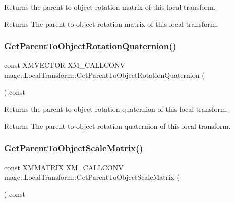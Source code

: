 Returns the parent-\/to-\/object rotation matrix of this local transform.

\begin{DoxyReturn}{Returns}
The parent-\/to-\/object rotation matrix of this local transform. 
\end{DoxyReturn}
\hypertarget{classmage_1_1_local_transform_a66e6d3320e87461203f91599e23ee6c1}{}\label{classmage_1_1_local_transform_a66e6d3320e87461203f91599e23ee6c1} 
\subsubsection{\texorpdfstring{Get\+Parent\+To\+Object\+Rotation\+Quaternion()}{GetParentToObjectRotationQuaternion()}}
{\footnotesize\ttfamily const X\+M\+V\+E\+C\+T\+OR X\+M\+\_\+\+C\+A\+L\+L\+C\+O\+NV mage\+::\+Local\+Transform\+::\+Get\+Parent\+To\+Object\+Rotation\+Quaternion (\begin{DoxyParamCaption}{ }\end{DoxyParamCaption}) const\hspace{0.3cm}{\ttfamily [noexcept]}}

Returns the parent-\/to-\/object rotation quaternion of this local transform.

\begin{DoxyReturn}{Returns}
The parent-\/to-\/object rotation quaternion of this local transform. 
\end{DoxyReturn}
\hypertarget{classmage_1_1_local_transform_a81ef828c64270716e5095f2cf571fad7}{}\label{classmage_1_1_local_transform_a81ef828c64270716e5095f2cf571fad7} 
\subsubsection{\texorpdfstring{Get\+Parent\+To\+Object\+Scale\+Matrix()}{GetParentToObjectScaleMatrix()}}
{\footnotesize\ttfamily const X\+M\+M\+A\+T\+R\+IX X\+M\+\_\+\+C\+A\+L\+L\+C\+O\+NV mage\+::\+Local\+Transform\+::\+Get\+Parent\+To\+Object\+Scale\+Matrix (\begin{DoxyParamCaption}{ }\end{DoxyParamCaption}) const\hspace{0.3cm}{\ttfamily [noexcept]}}

